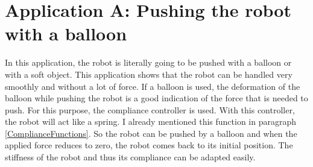 \documentclass[11pt,a4paper]{report}
\begin{document}
\section{Application A: Pushing the robot with a balloon}
In this application, the robot is literally going to be pushed with a balloon or with a soft object. This application shows that the robot can be handled very smoothly and without a lot of force. If a balloon is used, the deformation of the balloon while pushing the robot is a good indication of the force that is needed to push. For this purpose, the compliance controller is used. With this controller, the robot will act like a spring. I already mentioned this function in paragraph \ref{ComplianceFunctions}. So the robot can be pushed by a balloon and when the applied force reduces to zero, the robot comes back to its initial position. The stiffness of the robot and thus its compliance can be adapted easily.
\end{document}
